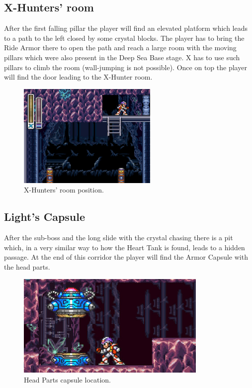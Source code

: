 \subsection{X-Hunters' room}
After the first falling pillar the player will find an elevated platform which leads to a path to the left closed by some crystal blocks. The player has to bring the Ride Armor there to open the path and reach a large room with the moving pillars which were also present in the Deep Sea Base stage. X has to use such pillars to climb the room (wall-jumping is not possible). Once on top the player will find the door leading to the X-Hunter room.
\begin{figure}[htp]
	\centering
	\includegraphics[height=5cm]{figures/X2/Crystal_snail/Crystal_hunter_room.png}
	\caption{X-Hunters' room position.}
\end{figure}

\subsection{Light's Capsule}\label{X2:Head_parts}
After the sub-boss and the long slide with the crystal chasing there is a pit which, in a very similar way to how the Heart Tank is found, leads to a hidden passage. At the end of this corridor the player will find the Armor Capsule with the head parts.
\begin{figure}[htp]
	\centering
	\includegraphics[height=5cm]{figures/X2/Crystal_snail/Crystal_capsule.jpg}
	\caption{Head Parts capsule location.}
\end{figure}


